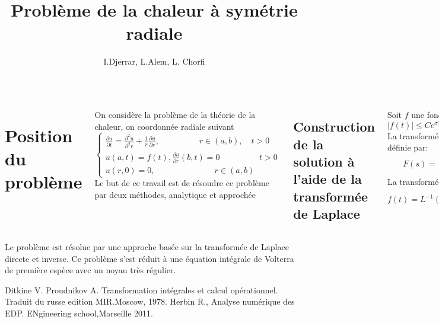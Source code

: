 \documentclass[25pt,a1paper]{tikzposter}
\begin{document}
\title{Problème de la chaleur à symétrie radiale }
\author{I.Djerrar, L.Alem, L. Chorfi}
\maketitle
\begin{columns}
{
\section{Position du problème}
On considère la problème de la théorie de la chaleur, on coordonnée radiale suivant
\begin{equation}
\begin{cases}
\frac{\partial u}{\partial t}=\frac{\partial ^2u}{\partial ^2 r}+\frac{1}{r}\frac{\partial u}{\partial r},\hspace{2cm} r\in\left( a,b\right), \quad t>0\\
u(a,t)=f(t) , \frac{\partial u}{\partial r }(b,t)=0 \hspace{2cm} t>0\\
u(r,0)=0, \hspace{3cm} r\in(a,b)
\end{cases}
\end{equation} 
Le but de ce travail est de résoudre ce problème par deux méthodes, analytique et approchée
}
{
\subsection{Construction de la solution à l'aide de la transformée de Laplace }
Soit $f$  une fonction tel que $|{f(t)}| \leq Ce^{\sigma T}, \sigma\geq 0,$\\
La transformée de la place $F(s)=L(f)$ est définie par:
$$F(s) = \int_{0}^{+\infty}f(t)e^{-st}dt,  Re(s)\geq \sigma $$
La transformée inverse est donnée par\cite{Ditkine}
$$f(t)= L^{-1}(F)(t)=\frac{1}{2\pi i}\int_{\sigma-i\infty}^{\sigma+i\infty}F(s)e^{st}ds$$
}
{
\texttt{[image: fig2.png]}
}
\end{columns}
{
Le problème est résolue par une approche basée sur la transformée de Laplace directe et inverse. Ce problème s'est réduit à une équation intégrale de Volterra de première espèce avec un noyau très régulier.
}
{
\begin{thebibliography}{}
 Ditkine V. Proudnikov A. Transformation intégrales et calcul opérationnel. Traduit du russe edition MIR.Moscow, 1978.
 Herbin R., Analyse numérique des EDP. ENgineering school,Marseille 2011.
\end{thebibliography}{}
}
\end{document}
